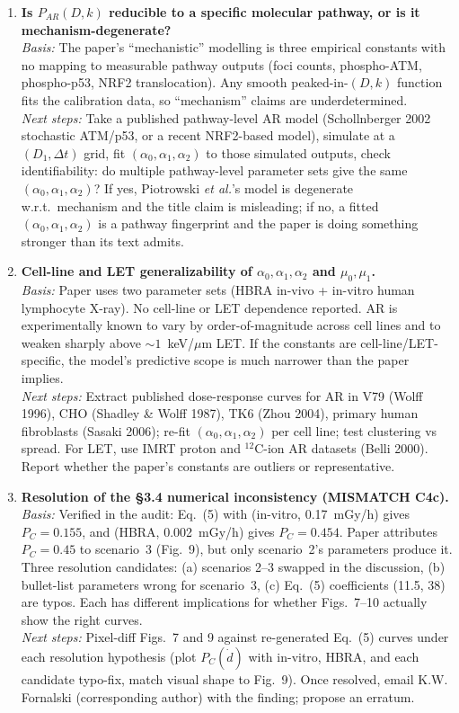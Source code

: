 \begin{enumerate}
\item \textbf{Is $P_{AR}(D,k)$ reducible to a specific molecular pathway, or is it
mechanism-degenerate?}\\
\emph{Basis:} The paper's ``mechanistic'' modelling is three empirical constants with no
mapping to measurable pathway outputs (foci counts, phospho-ATM, phospho-p53, NRF2
translocation). Any smooth peaked-in-$(D,k)$ function fits the calibration data, so
``mechanism'' claims are underdetermined.\\
\emph{Next steps:} Take a published pathway-level AR model (Schollnberger 2002
stochastic ATM/p53, or a recent NRF2-based model), simulate at a $(D_1,\Delta t)$
grid, fit $(\alpha_0,\alpha_1,\alpha_2)$ to those simulated outputs, check
identifiability: do multiple pathway-level parameter sets give the same
$(\alpha_0,\alpha_1,\alpha_2)$? If yes, Piotrowski \emph{et al.}'s model is degenerate
w.r.t.\ mechanism and the title claim is misleading; if no, a fitted
$(\alpha_0,\alpha_1,\alpha_2)$ is a pathway fingerprint and the paper is doing something
stronger than its text admits.

\item \textbf{Cell-line and LET generalizability of $\alpha_0,\alpha_1,\alpha_2$ and
$\mu_0,\mu_1$.}\\
\emph{Basis:} Paper uses two parameter sets (HBRA in-vivo + in-vitro human lymphocyte
X-ray). No cell-line or LET dependence reported. AR is experimentally known to vary by
order-of-magnitude across cell lines and to weaken sharply above $\sim 1$~keV/$\mu$m
LET. If the constants are cell-line/LET-specific, the model's predictive scope is much
narrower than the paper implies.\\
\emph{Next steps:} Extract published dose-response curves for AR in V79 (Wolff 1996),
CHO (Shadley \& Wolff 1987), TK6 (Zhou 2004), primary human fibroblasts (Sasaki 2006);
re-fit $(\alpha_0,\alpha_1,\alpha_2)$ per cell line; test clustering vs spread. For LET,
use IMRT proton and $^{12}$C-ion AR datasets (Belli 2000). Report whether the paper's
constants are outliers or representative.

\item \textbf{Resolution of the \S3.4 numerical inconsistency (MISMATCH C4c).}\\
\emph{Basis:} Verified in the audit: Eq.~(5) with (in-vitro, 0.17~mGy/h) gives
$P_C=0.155$, and (HBRA, 0.002~mGy/h) gives $P_C=0.454$. Paper attributes
$P_C=0.45$ to scenario~3 (Fig.~9), but only scenario~2's parameters produce it.
Three resolution candidates: (a) scenarios 2--3 swapped in the discussion, (b) bullet-list
parameters wrong for scenario~3, (c) Eq.~(5) coefficients (11.5, 38) are typos. Each
has different implications for whether Figs.~7--10 actually show the right curves.\\
\emph{Next steps:} Pixel-diff Figs.~7 and 9 against re-generated Eq.~(5) curves under
each resolution hypothesis (plot $P_C(\dot{d})$ with in-vitro, HBRA, and each
candidate typo-fix, match visual shape to Fig.~9). Once resolved, email K.W. Fornalski
(corresponding author) with the finding; propose an erratum.

\end{enumerate}
